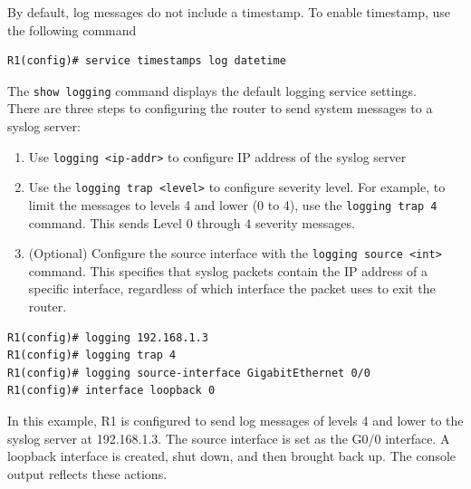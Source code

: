 By default, log messages do not include a timestamp. To enable timestamp, use the following command

\begin{verbatim}
R1(config)# service timestamps log datetime
\end{verbatim}

The \verb|show logging| command displays the default logging service settings.\\

There are three steps to configuring the router to send system messages to a syslog server:

\begin{enumerate}
\item Use \verb|logging <ip-addr>| to configure IP address of the syslog server

\item Use the \verb|logging trap <level>| to configure severity level. For example, to limit the messages to levels 4 and lower (0 to 4), use the \verb|logging trap 4 | command. This sends Level 0 through 4 severity messages.

\item (Optional) Configure the source interface with the \verb|logging source <int>| command. This specifies that syslog packets contain the IP address of a specific interface, regardless of which interface the packet uses to exit the router.
\end{enumerate}

\begin{verbatim}
R1(config)# logging 192.168.1.3
R1(config)# logging trap 4
R1(config)# logging source-interface GigabitEthernet 0/0
R1(config)# interface loopback 0
\end{verbatim}

In this example, R1 is configured to send log messages of levels 4 and lower to the syslog server at 192.168.1.3. The source interface is set as the G0/0 interface. A loopback interface is created, shut down, and then brought back up. The console output reflects these actions.